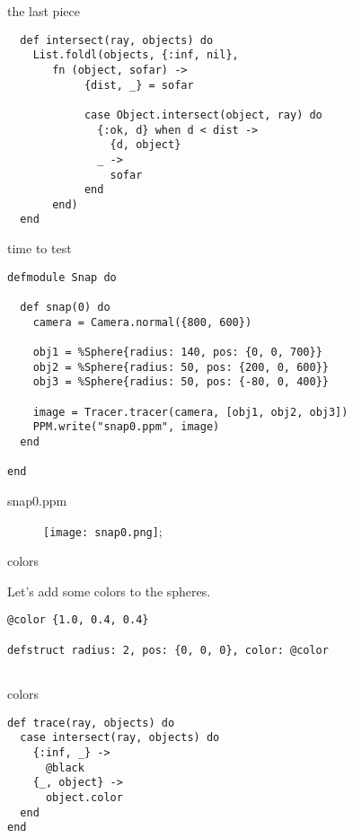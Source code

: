 \begin{frame}[fragile]{the last piece}

\begin{verbatim}
  def intersect(ray, objects) do
    List.foldl(objects, {:inf, nil}, 
       fn (object, sofar) ->
            {dist, _} = sofar

            case Object.intersect(object, ray) do
              {:ok, d} when d < dist ->
                {d, object}
              _ ->
                sofar
            end
       end)
  end
\end{verbatim}

\end{frame}

\begin{frame}[fragile]{time to test}
\begin{verbatim}
defmodule Snap do

  def snap(0) do
    camera = Camera.normal({800, 600})

    obj1 = %Sphere{radius: 140, pos: {0, 0, 700}}
    obj2 = %Sphere{radius: 50, pos: {200, 0, 600}}
    obj3 = %Sphere{radius: 50, pos: {-80, 0, 400}}

    image = Tracer.tracer(camera, [obj1, obj2, obj3])
    PPM.write("snap0.ppm", image)
  end

end
\end{verbatim}
\end{frame}

\begin{frame}{snap0.ppm}

\begin{figure}
\texttt{[image: snap0.png]};
\end{figure}

\end{frame}


\begin{frame}[fragile]{colors}

\pause Let's add some colors to the spheres.

\begin{verbatim}
@color {1.0, 0.4, 0.4}

defstruct radius: 2, pos: {0, 0, 0}, color: @color 


\end{verbatim}
\end{frame}

\begin{frame}[fragile]{colors}

\begin{verbatim}
def trace(ray, objects) do
  case intersect(ray, objects) do
    {:inf, _} ->
      @black
    {_, object} ->
      object.color
  end
end
\end{verbatim}
\end{frame}


